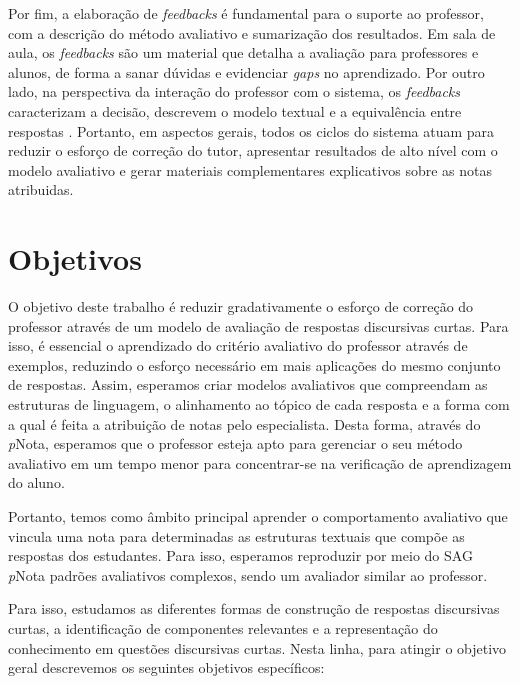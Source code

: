 Por fim, a elaboração de \textit{feedbacks} é fundamental para o suporte ao professor, com a descrição do método avaliativo e sumarização dos resultados. Em sala de aula, os \textit{feedbacks} são um material que detalha a avaliação para professores e alunos, de forma a sanar dúvidas e evidenciar \textit{gaps} no aprendizado. Por outro lado, na perspectiva da interação do professor com o sistema, os \textit{feedbacks} caracterizam a decisão, descrevem o modelo textual e a equivalência entre respostas \cite{bernius2022}. Portanto, em aspectos gerais, todos os ciclos do sistema atuam para reduzir o esforço de correção do tutor, apresentar resultados de alto nível com o modelo avaliativo e gerar materiais complementares explicativos sobre as notas atribuidas.

\section{Objetivos} \label{cap1-objetivos}

O objetivo deste trabalho é reduzir gradativamente o esforço de correção do professor através de um modelo de avaliação de respostas discursivas curtas. Para isso, é essencial o aprendizado do critério avaliativo do professor através de exemplos, reduzindo o esforço necessário em mais aplicações do mesmo conjunto de respostas. Assim, esperamos criar modelos avaliativos que compreendam as estruturas de linguagem, o alinhamento ao tópico de cada resposta e a forma com a qual é feita a atribuição de notas pelo especialista. Desta forma, através do \textit{p}Nota, esperamos que o professor esteja apto para gerenciar o seu método avaliativo em um tempo menor para concentrar-se na verificação de aprendizagem do aluno.

Portanto, temos como âmbito principal aprender o comportamento avaliativo que vincula uma nota para determinadas as estruturas textuais que compõe as respostas dos estudantes. Para isso, esperamos reproduzir por meio do SAG \textit{p}Nota padrões avaliativos complexos, sendo um avaliador similar ao professor.

Para isso, estudamos as diferentes formas de construção de respostas discursivas curtas, a identificação de componentes relevantes e a representação do conhecimento em questões discursivas curtas. Nesta linha, para atingir o objetivo geral descrevemos os seguintes objetivos específicos:

